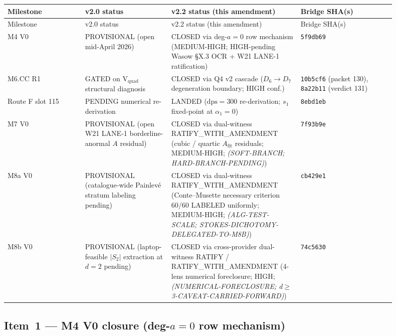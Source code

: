 \documentclass[11pt,a4paper]{article}
\theoremstyle{definition}
\theoremstyle{remark}
\begin{document}
\begin{center}
\renewcommand{\arraystretch}{1.20}
\begin{longtable}{@{}p{0.18\linewidth} p{0.20\linewidth} p{0.30\linewidth} p{0.22\linewidth}@{}}
\toprule
Milestone & v2.0 status & v2.2 status (this amendment) & Bridge SHA(s) \\
\midrule
\endfirsthead
\toprule
Milestone & v2.0 status & v2.2 status (this amendment) & Bridge SHA(s) \\
\midrule
\endhead
M4 V0 & PROVISIONAL (open mid-April 2026) & CLOSED via deg-$a=0$ row mechanism (MEDIUM-HIGH; HIGH-pending Wasow \S X.3 OCR + W21 LANE-1 ratification) & \texttt{5f9db69} \\
M6.CC R1 & GATED on V$_{\mathrm{quad}}$ structural diagnosis & CLOSED via Q4 v2 cascade ($D_6 \to D_7$ degeneration boundary; HIGH conf.) & \texttt{10b5cf6} (packet 130), \texttt{8a22b11} (verdict 131) \\
Route F slot 115 & PENDING numerical re-derivation & LANDED ($\mathrm{dps}=300$ re-derivation; $s_1$ fixed-point at $\alpha_1=0$) & \texttt{8ebd1eb} \\
M7 V0 & PROVISIONAL (open W21 LANE-1 borderline-anormal $A$ residual) & CLOSED via dual-witness RATIFY\_WITH\_AMENDMENT (cubic / quartic $A_{\mathrm{fit}}$ residuals; MEDIUM-HIGH; \emph{(SOFT-BRANCH; HARD-BRANCH-PENDING)}) & \texttt{7f93b9e} \\
M8a V0 & PROVISIONAL (catalogue-wide Painlev\'e stratum labeling pending) & CLOSED via dual-witness RATIFY\_WITH\_AMENDMENT (Conte--Musette necessary criterion 60/60 LABELED uniformly; MEDIUM-HIGH; \emph{(ALG-TEST-SCALE; STOKES-DICHOTOMY-DELEGATED-TO-M8B)}) & \texttt{cb429e1} \\
M8b V0 & PROVISIONAL (laptop-feasible $|S_2|$ extraction at $d=2$ pending) & CLOSED via cross-provider dual-witness RATIFY / RATIFY\_WITH\_AMENDMENT (4-lens numerical foreclosure; HIGH; \emph{(NUMERICAL-FORECLOSURE; d$\geq$3-CAVEAT-CARRIED-FORWARD)}) & \texttt{74c5630} \\
\bottomrule
\end{longtable}
\end{center}

\subsection{Item~1 --- M4 V0 closure (deg-$a=0$ row mechanism)}
\label{sec:closure-cascade-m4}
\end{document}
